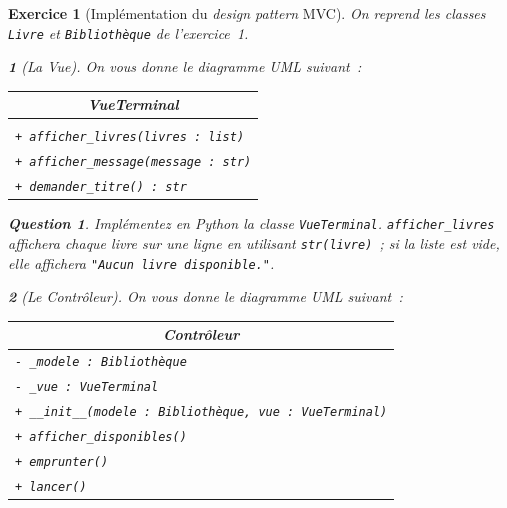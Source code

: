 \documentclass{article}
\theoremstyle{exostyle}
\newtheorem{exo}{Exercice}
\theoremstyle{partiestyle}
\newtheorem{partie}{}[exo]
\theoremstyle{questionstyle}
\newtheorem{questionpartie}{Question}[partie]
\begin{document}
\begin{exo}[Implémentation du \textit{design pattern} MVC]

On reprend les classes \texttt{Livre} et \texttt{Bibliothèque} de l'exercice~1.

    \begin{partie}[La Vue]

        On vous donne le diagramme UML suivant~:

        \begin{center}
        \renewcommand{\arraystretch}{1.0}
        \begin{tabular}{|p{7cm}|}
        \hline
        \multicolumn{1}{|c|}{\textbf{VueTerminal}} \\
        \hline
        \multicolumn{1}{|c|}{\phantom{(aucun attribut)}} \\
        \hline
        \texttt{+ afficher\_livres(livres\,:\,list)} \\
        \texttt{+ afficher\_message(message\,:\,str)} \\
        \texttt{+ demander\_titre() : str} \\
        \hline
        \end{tabular}
        \end{center}

        \begin{questionpartie}
            Implémentez en Python la classe \texttt{VueTerminal}. \texttt{afficher\_livres} affichera chaque livre sur une ligne en utilisant \texttt{str(livre)}~; si la liste est vide, elle affichera \texttt{"Aucun livre disponible."}.
        \end{questionpartie}

    \end{partie}

    \begin{partie}[Le Contrôleur]

        On vous donne le diagramme UML suivant~:

        \begin{center}
        \renewcommand{\arraystretch}{1.0}
        \begin{tabular}{|p{9cm}|}
        \hline
        \multicolumn{1}{|c|}{\textbf{Contrôleur}} \\
        \hline
        \texttt{- \_modele\,:\,Bibliothèque} \\
        \texttt{- \_vue\,:\,VueTerminal} \\
        \hline
        \texttt{+ \_\_init\_\_(modele\,:\,Bibliothèque,\,vue\,:\,VueTerminal)} \\
        \texttt{+ afficher\_disponibles()} \\
        \texttt{+ emprunter()} \\
        \texttt{+ lancer()} \\
        \hline
        \end{tabular}
        \end{center}


\end{partie}
\end{exo}
\end{document}
